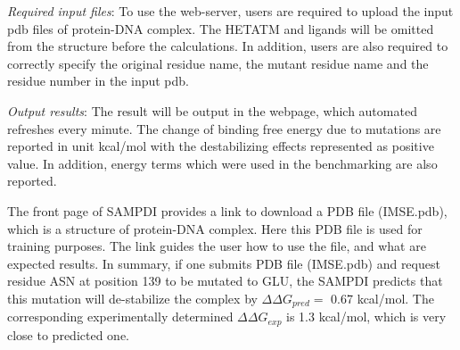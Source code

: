 \documentclass[9pt,tutorial]{livecoms}
\begin{document}
\textit{Required input files}: To use the web-server, users are required to upload the input pdb files of protein-DNA complex. The HETATM and ligands will be omitted from the structure before the calculations. In addition, users are also required to correctly specify the original residue name, the mutant residue name and the residue number in the input pdb.

\textit{Output results}: The result will be output in the webpage, which automated refreshes every minute. The change of binding free energy due to mutations are reported in unit kcal/mol with the destabilizing effects represented as positive value. In addition, energy terms which were used in the benchmarking are also reported. 

The front page of SAMPDI provides a link to download a PDB file (IMSE.pdb), which is a structure of protein-DNA complex. Here this PDB file is used for training purposes. The link guides the user how to use the file, and what are expected results. In summary, if one submits PDB file (IMSE.pdb) and request residue ASN at position 139 to be mutated to GLU, the SAMPDI predicts that this mutation will de-stabilize the complex by $ \Delta\Delta G_{pred} =$ 0.67 kcal/mol. The corresponding experimentally determined $ \Delta\Delta G_{exp} $ is 1.3 kcal/mol, which is very close to predicted one.
\end{document}

